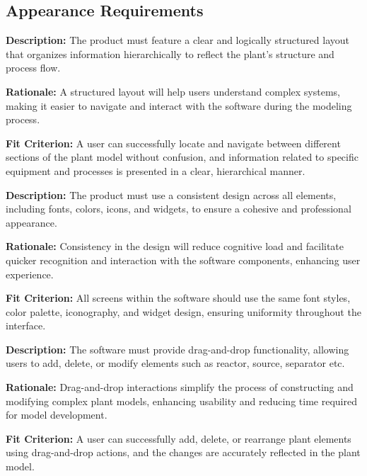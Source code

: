 \documentclass[12pt]{article}
\begin{document}
\subsection{Appearance Requirements}
\begin{tcolorbox}[title=LAFAR1]
  \textbf{Description:} The product must feature a clear and logically structured layout that organizes information hierarchically to reflect the plant’s structure and process flow.
  
  \textbf{Rationale:} A structured layout will help users understand complex systems, making it easier to navigate and interact with the software during the modeling process.
  
  \textbf{Fit Criterion:} A user can successfully locate and navigate between different sections of the plant model without confusion, and information related to specific equipment and processes is presented in a clear, hierarchical manner.
\end{tcolorbox}

\vspace{0.5cm}

\begin{tcolorbox}[title=LAFAR2]
  \textbf{Description:} The product must use a consistent design across all elements, including fonts, colors, icons, and widgets, to ensure a cohesive and professional appearance.

  \textbf{Rationale:} Consistency in the design will reduce cognitive load and facilitate quicker recognition and interaction with the software components, enhancing user experience.

  \textbf{Fit Criterion:} All screens within the software should use the same font styles, color palette, iconography, and widget design, ensuring uniformity throughout the interface.
\end{tcolorbox}

\vspace{0.5cm}


\begin{tcolorbox}[title=LAFAR3]
  \textbf{Description:} The software must provide drag-and-drop functionality, allowing users to add, delete, or modify elements such as reactor, source, separator etc.

  \textbf{Rationale:} Drag-and-drop interactions simplify the process of constructing and modifying complex plant models, enhancing usability and reducing time required for model development.

  \textbf{Fit Criterion:} A user can successfully add, delete, or rearrange plant elements using drag-and-drop actions, and the changes are accurately reflected in the plant model.
\end{tcolorbox}
\end{document}
